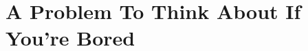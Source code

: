 \documentclass[11pt]{scrartcl}
\begin{document}

\section{A Problem To Think About If You're Bored}
\end{document}
